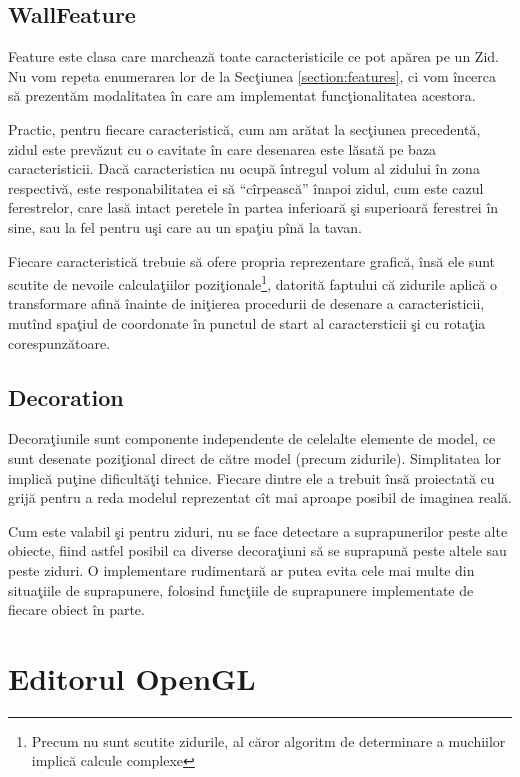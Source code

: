 \subsection{WallFeature}

Feature este clasa care marchează toate caracteristicile ce pot apărea pe un
Zid. Nu vom repeta enumerarea lor de la Secţiunea \ref{section:features}, ci vom
încerca să prezentăm modalitatea în care am implementat funcţionalitatea
acestora.

Practic, pentru fiecare caracteristică, cum am arătat la secţiunea precedentă,
zidul este prevăzut cu o cavitate în care desenarea este lăsată pe baza
caracteristicii. Dacă caracteristica nu ocupă întregul volum al zidului în zona
respectivă, este responabilitatea ei să ``cîrpească'' înapoi zidul, cum este
cazul ferestrelor, care lasă intact peretele în partea inferioară şi superioară
ferestrei în sine, sau la fel pentru uşi care au un spaţiu pînă la tavan.

Fiecare caracteristică trebuie să ofere propria reprezentare grafică, însă ele
sunt scutite de nevoile calculaţiilor poziţionale\footnote{Precum nu sunt
scutite zidurile, al căror algoritm de determinare a muchiilor implică calcule
complexe}, datorită faptului că zidurile aplică o transformare afină înainte de
iniţierea procedurii de desenare a caracteristicii, mutînd spaţiul de coordonate
în punctul de start al caractersticii şi cu rotaţia corespunzătoare.

\subsection{Decoration}

Decoraţiunile sunt componente independente de celelalte elemente de model, ce
sunt desenate poziţional direct de către model (precum zidurile). Simplitatea
lor implică puţine dificultăţi tehnice. Fiecare dintre ele a trebuit însă
proiectată cu grijă pentru a reda modelul reprezentat cît mai aproape posibil de
imaginea reală.

Cum este valabil şi pentru ziduri, nu se face detectare a suprapunerilor peste
alte obiecte, fiind astfel posibil ca diverse decoraţiuni să se suprapună peste
altele sau peste ziduri. O implementare rudimentară ar putea evita cele mai
multe din situaţiile de suprapunere, folosind funcţiile de suprapunere
implementate de fiecare obiect în parte.

\section{Editorul OpenGL}

